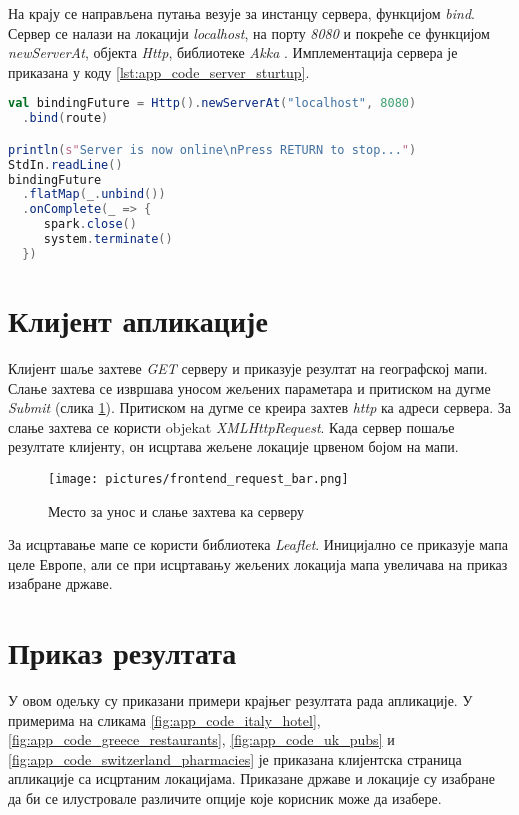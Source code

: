 \documentclass[12pt,oneside]{memoir}
\begin{document}
На крају се направљена путања везује за инстанцу сервера, функцијом \textit{bind}. Сервер се налази на локацији \textit{localhost}, на порту \textit{8080} и покреће се функцијом \textit{newServerAt}, објекта \textit{Http}, библиотеке \textit{Akka} \cite{using_akka_http}. Имплементација сервера је приказана у коду \ref{lst:app_code_server_sturtup}.

\begin{lstlisting}[caption={Имплементација сервера}, language=Scala, label={lst:app_code_server_sturtup}]
val bindingFuture = Http().newServerAt("localhost", 8080)
  .bind(route)

println(s"Server is now online\nPress RETURN to stop...")
StdIn.readLine()
bindingFuture
  .flatMap(_.unbind())
  .onComplete(_ => {
     spark.close()
     system.terminate()
  })
\end{lstlisting}


\section{Клијент апликације}
\label{sec:app_client}

Клијент шаље захтеве \textit{GET} серверу и приказује резултат на географској мапи. Слање захтева се извршава уносом жељених параметара и притиском на дугме \textit{Submit} (слика \ref{fig:app_code_request_bar_front}). Притиском на дугме се креира захтев \textit{http} ка адреси сервера. За слање захтева се користи objekat \textit{XMLHttpRequest}. Када сервер пошаље резултате клијенту, он исцртава жељене локације црвеном бојом на мапи.

\begin{figure}[!ht]
  \centering
  \texttt{[image: pictures/frontend\_request\_bar.png]}
  \caption{Место за унос и слање захтева ка серверу}
  \label{fig:app_code_request_bar_front}
\end{figure}

За исцртавање мапе се користи библиотека \textit{Leaflet}. Иницијално се приказује мапа целе Европе, али се при исцртавању жељених локација мапа увеличава на приказ изабране државе.

\section{Приказ резултата}
\label{sec:rezultat}

У овом одељку су приказани примери крајњег резултата рада апликације. У примерима на сликама \ref{fig:app_code_italy_hotel}, \ref{fig:app_code_greece_restaurants}, \ref{fig:app_code_uk_pubs} и \ref{fig:app_code_switzerland_pharmacies} је приказана клијентска страница апликације са исцртаним локацијама. Приказане државе и локације су изабране да би се илустровале различите опције које корисник може да изабере. 
\end{document}
